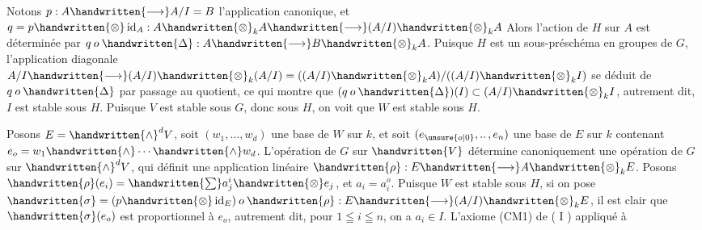 Notons $p:A\handwritten{\longrightarrow}A/I=B$ l'application canonique, et $q=p\handwritten{\otimes}\operatorname{id}_A:A\handwritten{\otimes}_k A\handwritten{\longrightarrow}(A/I)\handwritten{\otimes}_k A$ Alors l'action de $H$ sur $A$ est déterminée par $q\mathbin{o}\handwritten{\Delta}:A\handwritten{\longrightarrow}B\handwritten{\otimes}_k A$. Puisque $H$ est un sous-préschéma en groupes de $G$, l'application diagonale $A/I\handwritten{\longrightarrow}(A/I)\handwritten{\otimes}_k(A/I)=((A/I)\handwritten{\otimes}_k A)/((A/I)\handwritten{\otimes}_k I)$ se déduit de $q\mathbin{o}\handwritten{\Delta}$ par passage au quotient, ce qui montre que $(q\mathbin{o}\handwritten{\Delta})(I)\subset(A/I)\handwritten{\otimes}_k I$, autrement dit, $I$ est stable sous $H$. Puisque $V$ est stable sous $G$, donc sous $H$, on voit que $W$ est stable sous $H$.

Posons $E=\handwritten{\wedge}^d V$, soit $(w_1,\ldots,w_d)$ une base de $W$ sur $k$, et soit $(e_{\unsure{o|0}},\mathinner{..},e_n)$ une base de $E$ sur $k$ contenant $e_o=w_1\handwritten{\wedge}\cdots\handwritten{\wedge}w_d$. L'opération de $G$ sur $\handwritten{V}$ détermine canoniquement une opération de $G$ sur $\handwritten{\wedge}^d V$, qui définit une application linéaire $\handwritten{\rho}:E\handwritten{\longrightarrow}A\handwritten{\otimes}_k E$. Posons $\handwritten{\rho}(e_i)=\handwritten{\sum}a_j^i\handwritten{\otimes}e_j$, et $a_i=a_i^o$. Puisque $W$ est stable sous $H$, si on pose $\handwritten{\sigma}=(p\handwritten{\otimes}\operatorname{id}_E)\mathbin{o}\handwritten{\rho}:E\handwritten{\longrightarrow}(A/I)\handwritten{\otimes}_k E$, il est clair que $\handwritten{\sigma}(e_o)$ est proportionnel à $e_o$, autrement dit, pour $1\leqq i\leqq n$, on a $a_i\in I$. L'axiome (CM1) de ( I ) appliqué à
